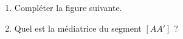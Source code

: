 
\begin{enumerate}
    \item
        Compléter la figure suivante.
    \item
        Quel est la médiatrice du segment \( [AA']\) ?
\end{enumerate}
 

\begin{center}
   
\end{center}

